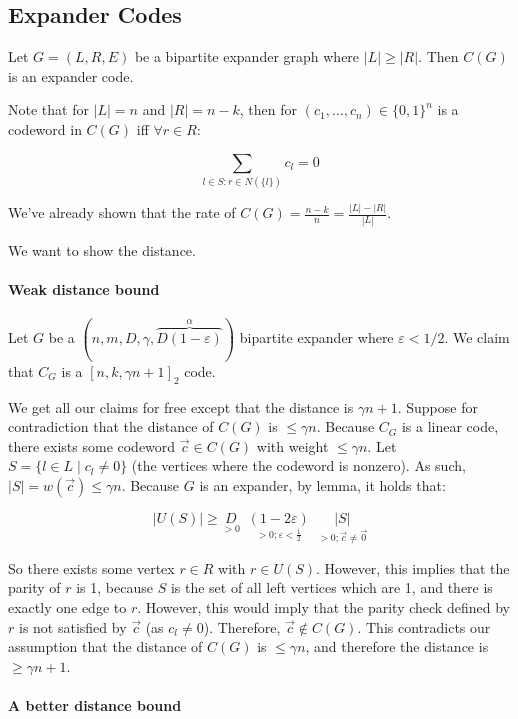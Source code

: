 \documentclass{idc_msc}
\begin{document}
\clearpage
\subsection{Expander Codes}

Let \(G = (L,R,E)\) be a bipartite expander graph where \(|L| \ge |R|\).
Then \(C(G)\) is an expander code.

Note that for \(|L|=n\) and \(|R| = n-k\), then for \((c_1,\ldots,c_n) \in \{0,1\}^n\) is a codeword in \(C(G)\) iff \(\forall r \in R\):

\[\sum_{l \in S : r \in N(\{l\})} c_l = 0\]

We've already shown that the rate of \(C(G) = \frac{n-k}{n} = \frac{|L|-|R|}{|L|}\).

We want to show the distance.

\paragraph{Weak distance bound}

Let \(G\) be a \((n,m,D,\gamma, \overbrace{D(1-\varepsilon)}^{\alpha})\) bipartite expander where \(\varepsilon < 1/2\).
We claim that \(C_G\) is a \([n,k,\gamma n+1]_2\) code.

We get all our claims for free except that the distance is \(\gamma n + 1\).
Suppose for contradiction that the distance of \(C(G)\) is \(\le \gamma n\).
Because \(C_G\) is a linear code, there exists some codeword \(\vec{c} \in C(G)\) with weight \(\le \gamma n\).
Let \(S = \{l \in L \mid c_l \ne 0\}\) (the vertices where the codeword is nonzero). As such, \(|S| = w(\vec{c}) \le \gamma n\).
Because \(G\) is an expander, by lemma, it holds that:

\[|U(S)| \ge \underset{> 0}{D}\;\;\underset{>0;\varepsilon < \frac{1}{2}}{(1 - 2\varepsilon)}\;\;\underset{> 0; \vec{c}\ne\vec{0}}{|S|}\]

So there exists some vertex \(r \in R\) with \(r \in U(S)\).
However, this implies that the parity of \(r\) is 1, because \(S\) is the set of all left vertices which are 1, and there is exactly one edge to \(r\).
However, this would imply that the parity check defined by \(r\) is not satisfied by \(\vec{c}\) (as \(c_l \ne 0\)).
Therefore, \(\vec{c} \notin C(G)\).
This contradicts our assumption that the distance of \(C(G)\) is \(\le \gamma n\), and therefore the distance is \(\ge \gamma n + 1\).

\paragraph{A better distance bound}
\end{document}
